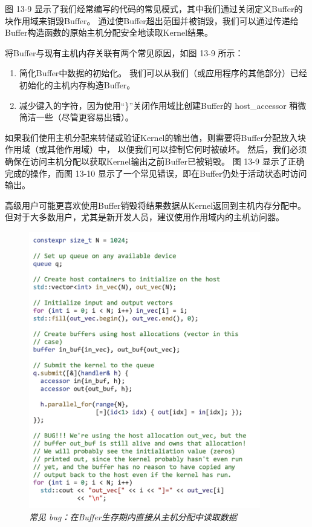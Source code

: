 图 13-9 显示了我们经常编写的代码的常见模式，其中我们通过关闭定义Buffer的块作用域来销毁Buffer。 
通过使Buffer超出范围并被销毁，我们可以通过传递给Buffer构造函数的原始主机分配安全地读取Kernel结果。

将Buffer与现有主机内存关联有两个常见原因，如图 13-9 所示：

\begin{enumerate}
	\item 简化Buffer中数据的初始化。 我们可以从我们（或应用程序的其他部分）已经初始化的主机内存构造Buffer。

	\item 减少键入的字符，因为使用“\}”关闭作用域比创建Buffer的 host\_accessor 稍微简洁一些（尽管更容易出错）。
\end{enumerate}

如果我们使用主机分配来转储或验证Kernel的输出值，则需要将Buffer分配放入块作用域（或其他作用域）中，
以便我们可以控制它何时被破坏。 然后，我们必须确保在访问主机分配以获取Kernel输出之前Buffer已被销毁。 
图 13-9 显示了正确完成的操作，而图 13-10 显示了一个常见错误，即在Buffer仍处于活动状态时访问输出。

\begin{remark}
	高级用户可能更喜欢使用Buffer销毁将结果数据从Kernel返回到主机内存分配中。
	但对于大多数用户，尤其是新开发人员，建议使用作用域内的主机访问器。
\end{remark}

\begin{figure}[H]
	\centering
	\includegraphics[width=0.9\textwidth]{figs/F13.10.png}
	\caption{\textit{常见 bug：在Buffer生存期内直接从主机分配中读取数据 }}
\end{figure}

